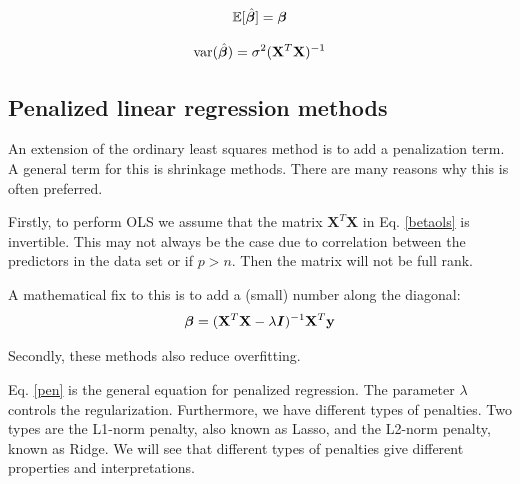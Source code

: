\begin{equation}
    \mathbb{E}[\hat{\boldsymbol{\beta}}] = \boldsymbol{\beta}
\end{equation}

\begin{equation}
   \text{var}(\hat{\boldsymbol{\beta}}) = \sigma^2 (\mathbf{X}^T\mathbf{X})^{-1}
\end{equation}



\subsection{Penalized linear regression methods}

An extension of the ordinary least squares method is to add a penalization term. A general term for this is shrinkage methods. There are many reasons why this is often preferred. 

Firstly, to perform OLS we assume that the matrix $\boldsymbol{X}^T\boldsymbol{X}$ in Eq. \ref{betaols} is invertible. This may not always be the case due to correlation between the predictors in the data set or if $p > n$. Then the matrix will not be full rank. 

A mathematical fix to this is to add a (small) number along the diagonal: 
\begin{equation}\label{pen}
    \boldsymbol{\beta} = (\mathbf{X}^T\mathbf{X}- \lambda\boldsymbol{I})^{-1}\mathbf{X}^T\mathbf{y}
\end{equation}

Secondly, these methods also reduce overfitting. 

Eq. \ref{pen} is the general equation for penalized regression. The parameter $\lambda$ controls the regularization. Furthermore, we have different types of penalties. Two types are the L1-norm penalty, also known as Lasso, and the L2-norm penalty, known as Ridge. We will see that different types of penalties give different properties and interpretations.


